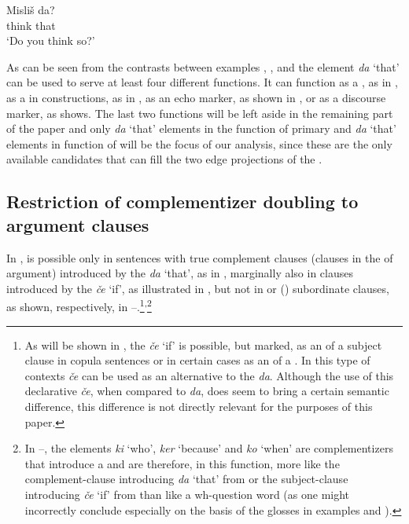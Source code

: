 \documentclass[output=paper,colorlinks,citecolor=brown]{langsci/langscibook}
\begin{document}
\begin{exe}
\ex \label{ex:plesnicar:eight}
\gll Misliš	da? \\
	think	that\\
\trans `Do you think so?'
\end{exe}

\noindent As can be seen from the contrasts between examples , ,  and  the  element \textit{da} `that' can be used to serve at least four different functions. It can function as a  , as in , as a   in  constructions, as in , as an echo marker, as shown in , or as a discourse marker, as  shows. The last two functions will be left aside in the remaining part of the paper and only \textit{da} `that' elements in the function of primary  and \textit{da} `that' elements in function of   will be the focus of our analysis, since these are the only available candidates that can fill the two edge projections of the .

\subsection{Restriction of complementizer doubling to argument clauses} \label{s23}
\largerpage[1.5]
In ,  is possible only in sentences with true complement clauses (clauses in the  of argument) introduced by the  \textit{da} `that', as in , marginally also in clauses introduced by the  \textit{če} `if', as illustrated in , but not in  or  () subordinate clauses, as shown, respectively, in --.\footnote{As will be shown in , the  \textit{če} `if' is possible, but marked, as an  of a subject clause in copula sentences or in certain cases as an  of a . In this type of contexts \textit{če} can be used as an alternative to the  \textit{da}. Although the use of this declarative \textit{če}, when compared to \textit{da}, does seem to bring a certain semantic difference, this difference is not directly relevant for the purposes of this paper.}\textsuperscript{,}\footnote{In --, the elements \textit{ki} `who', \textit{ker} `because' and \textit{ko} `when' are complementizers that introduce a  and are therefore, in this function, more like the complement-clause introducing \textit{da} `that' from  or the subject-clause introducing \textit{če} `if' from  than like a wh-question word (as one might incorrectly conclude especially on the basis of the glosses in examples  and ).}
\end{document}

